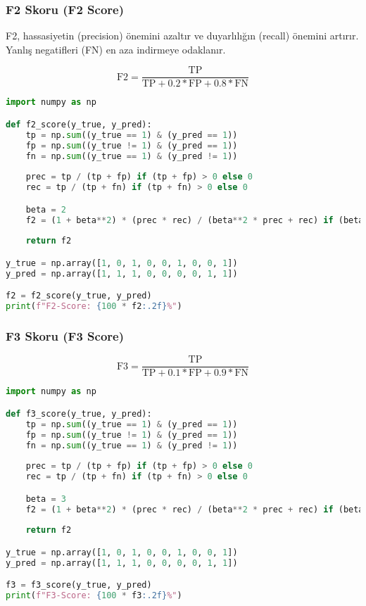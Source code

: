 \newpage

\subsubsection{F2 Skoru (F2 Score)}

F2, hassasiyetin (precision) önemini azaltır ve duyarlılığın (recall) önemini artırır. Yanlış negatifleri (FN) en aza indirmeye odaklanır.

\[\text{F2} = \frac{\text{TP}}{\text{TP} + 0.2 * \text{FP} + 0.8 * \text{FN}}\]

\begin{lstlisting}[language=Python]
import numpy as np

def f2_score(y_true, y_pred):
    tp = np.sum((y_true == 1) & (y_pred == 1))
    fp = np.sum((y_true != 1) & (y_pred == 1))
    fn = np.sum((y_true == 1) & (y_pred != 1))
    
    prec = tp / (tp + fp) if (tp + fp) > 0 else 0
    rec = tp / (tp + fn) if (tp + fn) > 0 else 0

    beta = 2
    f2 = (1 + beta**2) * (prec * rec) / (beta**2 * prec + rec) if (beta**2 * prec + rec) > 0 else 0
    
    return f2

y_true = np.array([1, 0, 1, 0, 0, 1, 0, 0, 1])
y_pred = np.array([1, 1, 1, 0, 0, 0, 0, 1, 1])

f2 = f2_score(y_true, y_pred)
print(f"F2-Score: {100 * f2:.2f}%")
\end{lstlisting}

\newpage

\subsubsection{F3 Skoru (F3 Score)}

\[\text{F3} = \frac{\text{TP}}{\text{TP} + 0.1 * \text{FP} + 0.9 * \text{FN}}\]

\begin{lstlisting}[language=Python]
import numpy as np

def f3_score(y_true, y_pred):
    tp = np.sum((y_true == 1) & (y_pred == 1))
    fp = np.sum((y_true != 1) & (y_pred == 1))
    fn = np.sum((y_true == 1) & (y_pred != 1))
    
    prec = tp / (tp + fp) if (tp + fp) > 0 else 0
    rec = tp / (tp + fn) if (tp + fn) > 0 else 0

    beta = 3
    f2 = (1 + beta**2) * (prec * rec) / (beta**2 * prec + rec) if (beta**2 * prec + rec) > 0 else 0
    
    return f2

y_true = np.array([1, 0, 1, 0, 0, 1, 0, 0, 1])
y_pred = np.array([1, 1, 1, 0, 0, 0, 0, 1, 1])

f3 = f3_score(y_true, y_pred)
print(f"F3-Score: {100 * f3:.2f}%")
\end{lstlisting}

